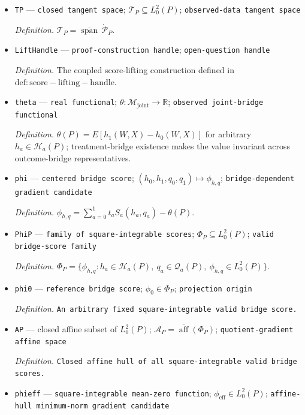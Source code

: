 \documentclass{article}
\begin{document}
\begin{itemize}
  \item \texttt{TP} --- \texttt{closed tangent space}; \(\mathcal T_P\subseteq L_0^2(P)\); \texttt{observed-\allowbreak{}data tangent space}
  \par\smallskip\noindent\emph{Definition.} \(\mathcal T_P=\overline{\operatorname{span}}\,\dot{\mathcal P}_P\).
  \item \texttt{LiftHandle} --- \texttt{proof-\allowbreak{}construction handle}; \texttt{open-\allowbreak{}question handle}
  \par\smallskip\noindent\emph{Definition.} The coupled score-lifting construction defined in \(\mathrm{def:score-lifting-handle}\).
  \item \texttt{theta} --- \texttt{real functional}; \(\theta:\mathcal M_{\mathrm{joint}}\to\mathbb R\); \texttt{observed joint-\allowbreak{}bridge functional}
  \par\smallskip\noindent\emph{Definition.} \(\theta(P)=E[h_1(W,X)-h_0(W,X)]\) for arbitrary \(h_a\in\mathcal H_a(P)\); treatment-bridge existence makes the value invariant across outcome-bridge representatives.
  \item \texttt{phi} --- \texttt{centered bridge score}; \((h_0,h_1,q_0,q_1)\mapsto\phi_{h,q}\); \texttt{bridge-\allowbreak{}dependent gradient candidate}
  \par\smallskip\noindent\emph{Definition.} \(\phi_{h,q}=\sum_{a=0}^1 t_aS_a(h_a,q_a)-\theta(P)\).
  \item \texttt{PhiP} --- \texttt{family of square-\allowbreak{}integrable scores}; \(\Phi_P\subseteq L_0^2(P)\); \texttt{valid bridge-\allowbreak{}score family}
  \par\smallskip\noindent\emph{Definition.} \(\Phi_P=\{\phi_{h,q}:h_a\in\mathcal H_a(P),\ q_a\in\mathcal Q_a(P),\ \phi_{h,q}\in L_0^2(P)\}\).
  \item \texttt{phi0} --- \texttt{reference bridge score}; \(\phi_0\in\Phi_P\); \texttt{projection origin}
  \par\smallskip\noindent\emph{Definition.} \texttt{An arbitrary fixed square-\allowbreak{}integrable valid bridge score.}
  \item \texttt{AP} --- closed affine subset of \(L_0^2(P)\); \(\mathcal A_P=\overline{\operatorname{aff}}(\Phi_P)\); \texttt{quotient-\allowbreak{}gradient affine space}
  \par\smallskip\noindent\emph{Definition.} \texttt{Closed affine hull of all square-\allowbreak{}integrable valid bridge scores.}
  \item \texttt{phieff} --- \texttt{square-\allowbreak{}integrable mean-\allowbreak{}zero function}; \(\phi_{\mathrm{eff}}\in L_0^2(P)\); \texttt{affine-\allowbreak{}hull minimum-\allowbreak{}norm gradient candidate}

\end{itemize}
\end{document}
